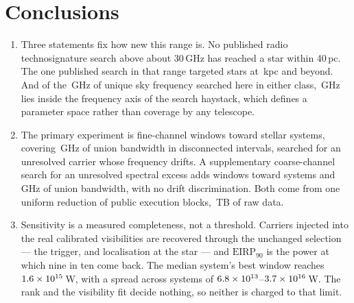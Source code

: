 \section{Conclusions}
\label{sec:conclusions}

\begin{enumerate}[leftmargin=1.6em,itemsep=4pt,topsep=4pt,parsep=0pt]

\item Three statements fix how new this range is. No published radio
technosignature search above about 30\,GHz has reached a star within 40\,pc. The one published search in that range targeted stars at
\MasonNearKpc\,kpc and beyond. And of the \UnionGHz\,GHz of unique sky
frequency searched here in either class, \UnionBandThree\,GHz lies inside the
frequency axis of the \citet{Wright2018} search haystack, which defines a
parameter space rather than coverage by any telescope.

\item The primary experiment is \NWinA{} fine-channel windows toward
\NSysClassA{} stellar systems, covering \CvUnionA\,GHz of union bandwidth in
disconnected intervals, searched for an unresolved carrier whose frequency
drifts. A supplementary coarse-channel search for an unresolved spectral
excess adds \NWinB{} windows toward \PrSysClassB{} systems and
\CvUnionB\,GHz of union bandwidth, with no drift discrimination. Both come
from one uniform reduction of \NEB{} public execution blocks,
\TotalDataTB\,TB of raw data.

\item Sensitivity is a measured completeness, not a threshold. Carriers
injected into the real calibrated visibilities are recovered through the
unchanged selection --- the trigger, and localisation at the star --- and
$\mathrm{EIRP}_{90}$ is the power at which nine in ten come back. The median
system's best window reaches $1.6\times10^{15}$\,W, with a spread across
systems of $6.8\times10^{13}$--$3.7\times10^{16}$\,W. The rank and the
visibility fit decide nothing, so neither is charged to that limit.


\end{enumerate}
